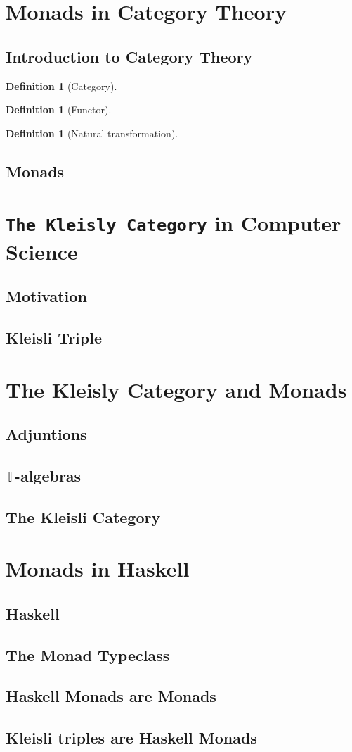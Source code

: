 \documentclass[a4paper]{article}
\theoremstyle{plain}
\theoremstyle{definition}
\newtheorem{definition}[theorem]{Definition}
\begin{document}
\tableofcontents
\clearpage
\section{Monads in Category Theory}
\subsection{Introduction to Category Theory}
\begin{definition}[Category]
\end{definition}
\begin{definition}[Functor]
\end{definition}
\begin{definition}[Natural transformation]
\end{definition}
\subsection{Monads}

\section{\texttt{The Kleisly Category} in Computer Science}
\subsection{Motivation}
\subsection{Kleisli Triple}

\section{The Kleisly Category and Monads}
\subsection{Adjuntions}
\subsection{$\mathbb{T}$-algebras}
\subsection{The Kleisli Category}

\section{Monads in Haskell}
\subsection{Haskell}
\subsection{The Monad Typeclass}
\subsection{Haskell Monads are Monads}
\subsection{Kleisli triples are Haskell Monads}
\end{document}
